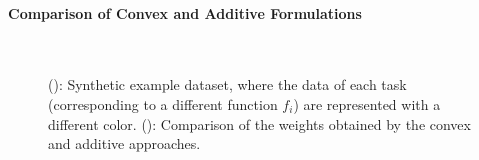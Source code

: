 \paragraph*{Comparison of Convex and Additive Formulations\\}

\begin{figure}
    \centering
    \quad%
    \\
    \caption{(\protect{}): Synthetic example dataset, where the data of each task (corresponding to a different function $f_i$) are represented with a different color.
    (\protect{}): Comparison of the weights obtained by the {convex} and {additive} approaches.}
    \label{fig:lines_slopes}
\end{figure}


